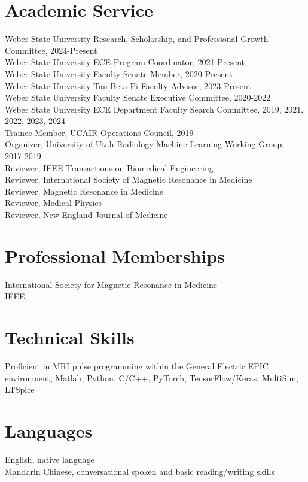 \section{\sc Academic Service}
%
Weber State University Research, Scholarship, and Professional Growth Committee, 2024-Present\\
Weber State University ECE Program Coordinator, 2021-Present\\
Weber State University Faculty Senate Member, 2020-Present\\
Weber State University Tau Beta Pi Faculty Advisor, 2023-Present\\
Weber State University Faculty Senate Executive Committee, 2020-2022\\
Weber State University ECE Department Faculty Search Committee, 2019, 2021, 2022, 2023, 2024\\
Trainee Member, UCAIR Operations Council, 2019\\
Organizer, University of Utah Radiology Machine Learning Working Group, 2017-2019\\
Reviewer, IEEE Transactions on Biomedical Engineering \\
Reviewer, International Society of Magnetic Resonance in Medicine\\
Reviewer, Magnetic Resonance in Medicine \\
Reviewer, Medical Physics\\
Reviewer, New England Journal of Medicine \\


\section{\sc Professional Memberships}
%
International Society for Magnetic Resonance in Medicine\\
IEEE

\section{\sc Technical Skills}
%
Proficient in MRI pulse programming within the General Electric EPIC environment, Matlab, Python, C/C++, PyTorch, TensorFlow/Keras, MultiSim, LTSpice

\section{\sc Languages}
% 
English, native language\\
Mandarin Chinese, conversational spoken and basic reading/writing skills







